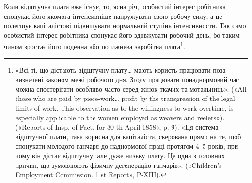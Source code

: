 Коли відштучна плата вже існує, то, ясна річ, особистий інтерес
робітника спонукає його якомога інтенсивніше напружувати
свою робочу силу, а це полегшує капіталістові підвищувати нормальний
ступінь інтенсивности. Так само особистий інтерес
робітника спонукає його здовжувати робочий день, бо таким
чином зростає його поденна або потижнева заробітна плата\footnote{
«Всі ті, що дістають відштучну плату\dots{} мають користь працювати
поза визначені законом межі робочого дня. Згоду працювати понаднормовий
час можна спостерігати особливо часто серед жінок-ткачих та мотальниць».
(«All those who are paid by piece-work\dots{} profit by the transgression
of the legal limits of work. This observation as to the willingness
to work overtime, is especially applicable to the women employed as weavers
and reelers»). («Reports of Insp. of Fact, for 30 th April 1858», p. 9).
«Ця система відштучної плати, така корисна для капіталіста, скерована
прямо на те, щоб спонукати молодого ганчаря до наднормової праці
протягом 4--5 років, при чому він дістає відштучну, але дуже низьку плату.
Це одна з головних причин, що зумовлюють фізичну дегенерацію ганчарів».
(«Children’s Employment Commission. 1 st Report», P-XIII).
}.
\parbreak{}  %
